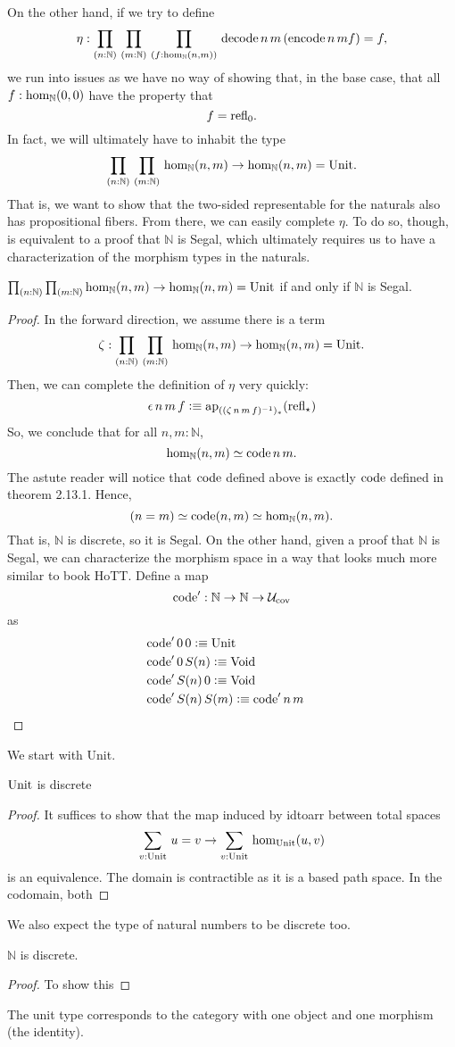 \documentclass[main.tex]{subfiles}
\begin{document}
On the other hand, if we try to define $$\eta : \prd{n:\mathbb{N}}{m:\mathbb{N}}{f : \ho[\mathbb{N}]{n}{m}}\dco\,n\,m\,(\eco\,n\,m f) =f,$$
we run into issues as we have no way of showing that, in the base case, that all $f : \ho[\mathbb{N}]{0}{0}$ have the property that $$f = \refl{0}.$$
In fact, we will ultimately have to inhabit the type $$\prd{n : \mathbb{N}}{m : \mathbb{N}}\ho[\mathbb{N}]{n}{m} \to \ho[\mathbb{N}]{n}{m}=\Un.$$
That is, we want to show that the two-sided representable for the naturals also has propositional fibers. From there, we can easily complete
$\eta$. To do so, though, is equivalent to a proof that $\mathbb{N}$ is Segal, which ultimately requires us to have a characterization of the 
morphism types in the naturals.
\begin{lemma}
    $\prd{n : \mathbb{N}}{m : \mathbb{N}}\ho[\mathbb{N}]{n}{m} \to \ho[\mathbb{N}]{n}{m}=\Un$ if and only if $\mathbb{N}$ is Segal.
\end{lemma}
\begin{proof}
    In the forward direction, we assume there is a term 
    $$\zeta : \prd{n : \mathbb{N}}{m : \mathbb{N}}\ho[\mathbb{N}]{n}{m} \to \ho[\mathbb{N}]{n}{m}=\Un.$$
    Then, we can complete the definition of $\eta$ very quickly:
    \begin{equation}
        \epsilon\,n\,m\,f \defeq \text{ap}_{((\zeta\,n\,m\,f)^{-1})_*}(\refl{\star})
    \end{equation}
    So, we conclude that for all $n,m : \mathbb{N}$,
    $$\ho[\mathbb{N}]{n}{m} \simeq \co\,n\,m.$$
    The astute reader will notice that $\co$ defined above is exactly $\co$ defined in theorem 2.13.1. Hence, $$(n=m)\simeq \co(n,m)\simeq\ho[\mathbb{N}]{n}{m}.$$
    That is, $\mathbb{N}$ is discrete, so it is Segal. On the other hand, given a proof that $\mathbb{N}$ is Segal, we can characterize the morphism space in a way that looks
    much more similar to book HoTT. Define a map $$\co' : \mathbb{N}\to\mathbb{N}\to\uc$$
    as
    \begin{align*}
        &\co'\,0\,0\defeq \Un&\\
        &\co'\,0\,S(n) \defeq \vo&\\
        &\co'\,S(n)\,0\defeq \vo&\\
        &\co'\,S(n)\,S(m)\defeq \co' \,n\,m&
    \end{align*}

\end{proof}


We start with Unit. 
\begin{lemma}
    $\Un$ is discrete
\end{lemma}
\begin{proof}
    It suffices to show that the map induced by idtoarr between total spaces
    \begin{equation}
        \sm{v:\Un}u = v \to \sm{v:\Un}\ho[\Un]{u}{v}
    \end{equation}
    is an equivalence. The domain is contractible as it is a based path space. In the codomain, both 
\end{proof}

We also expect the type of natural numbers to be discrete too. 

\begin{lemma} $\mathbb{N}$ is discrete.
\end{lemma}
\begin{proof}
    To show this
\end{proof}
The unit type corresponds to the category with one object and one morphism (the identity).
\end{document}
